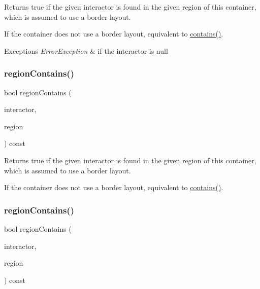 Returns true if the given interactor is found in the given region of this container, which is assumed to use a border layout. 

If the container does not use a border layout, equivalent to \mbox{\hyperlink{classGContainer_a29e67f98cd36414c67475b8941d861a6}{contains()}}. 
\begin{DoxyExceptions}{Exceptions}
{\em Error\+Exception} & if the interactor is null \\
\hline
\end{DoxyExceptions}
\mbox{\label{classGContainer_aa4cf95952747fd421a2b005eedbc662c}} 
\subsubsection{\texorpdfstring{region\+Contains()}{regionContains()}\hspace{0.1cm}{\footnotesize\ttfamily [3/4]}}
{\footnotesize\ttfamily bool region\+Contains (\begin{DoxyParamCaption}\item[{\mbox{\hyperlink{classGInteractor}{G\+Interactor}} \&}]{interactor,  }\item[{\mbox{\hyperlink{classGContainer_a81a01a86de31071a92e6cce0bab9bc4b}{G\+Container\+::\+Region}}}]{region }\end{DoxyParamCaption}) const\hspace{0.3cm}{\ttfamily [virtual]}}



Returns true if the given interactor is found in the given region of this container, which is assumed to use a border layout. 

If the container does not use a border layout, equivalent to \mbox{\hyperlink{classGContainer_a29e67f98cd36414c67475b8941d861a6}{contains()}}. \mbox{\label{classGContainer_ad67deacd62d3248fbe57ccbd4e96fb50}} 
\subsubsection{\texorpdfstring{region\+Contains()}{regionContains()}\hspace{0.1cm}{\footnotesize\ttfamily [4/4]}}
{\footnotesize\ttfamily bool region\+Contains (\begin{DoxyParamCaption}\item[{\mbox{\hyperlink{classGInteractor}{G\+Interactor}} \&}]{interactor,  }\item[{const std\+::string \&}]{region }\end{DoxyParamCaption}) const\hspace{0.3cm}{\ttfamily [virtual]}}



